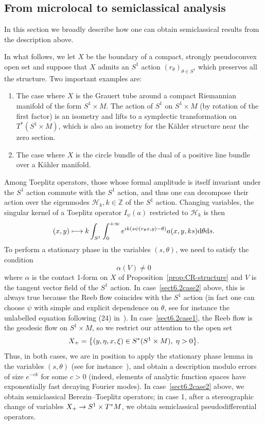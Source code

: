 \documentclass[10pt]{amsart}
\theoremstyle{definition}\newtheorem{defi}[theo]{Definition}\newtheorem{rema}[theo]{Remark}\newtheorem{exam}[theo]{Example}\newtheorem{exem}[theo]{Example}\newtheorem{nota}[theo]{Notation}
\newcommand{\clH}{\mathcal{H}}
\newcommand\1{\mathds{1}}
\newcommand{\Z}{\mathbb{Z}}
\newcommand{\dd}{\mathrm{d}}
\renewcommand*{\to}{\mathchoice{\longrightarrow}{\rightarrow}{\rightarrow}{\rightarrow}}
\let\oldmapsto\mapsto
\renewcommand*{\mapsto}{\mathchoice{\longmapsto}{\oldmapsto}{\oldmapsto}{\oldmapsto}}
\let\originalleft\left
\let\originalright\right
\renewcommand{\left}{\mathopen{}\mathclose\bgroup\originalleft}
\renewcommand{\right}{\aftergroup\egroup\originalright}
\begin{document}
\subsection{From microlocal to semiclassical analysis}\label{sec:from-micr-semicl}
In this section we broadly describe how one can obtain semiclassical results from the description above.

In what follows, we let $X$ be the boundary of a compact, strongly pseudoconvex open set and suppose that $X$ admits an $S^1$ action $(r_{\theta})_{\theta\in S^1}$ which preserves all the structure. Two important examples are:
\begin{enumerate}
\item\label{sect6.2case1} The case where $X$ is the Grauert tube around a compact Riemannian manifold of the form $S^1\times M$. The action of $S^1$ on $S^1\times M$ (by rotation of the first factor) is an isometry and lifts to a symplectic transformation on $T^*(S^1\times M)$, which is also an isometry for the K\"ahler structure near the zero section.
\item\label{sect6.2case2} The case where $X$ is the circle bundle of the dual of a positive line bundle over a K\"ahler manifold.
\end{enumerate}

Among Toeplitz operators, those whose formal amplitude is itself invariant under the $S^1$ action commute with the $S^1$ action, and thus one can decompose their action over the eigenmodes $\clH_k,k\in \Z$ of the $S^1$ action. Changing variables, the singular kernel of a Toeplitz operator $I_{\psi}(a)$ restricted to $\clH_k$ is then
\[
(x,y)\mapsto k\int_{S^1}\int_{0}^{+\infty}e^{ik(s\psi(r_{\theta}x,y)-\theta)}a(x,y,ks)\dd
\theta \dd s.
\]
To perform a stationary phase in the variables $(s,\theta)$, we need to satisfy the condition
\[
\alpha(V)\neq 0
\]
where $\alpha$ is the contact 1-form on $X$ of Proposition~\ref{prop:CR-structure} and $V$ is the tangent vector field of the $S^1$ action. In case~\eqref{sect6.2case2} above, this is always true because the Reeb flow coincides with the $S^1$ action (in fact one can choose $\psi$ with simple and explicit dependence on $\theta$, see for instance the unlabelled equation following (24) in~\cite{zelditch_pointwise_2018}). In case~\eqref{sect6.2case1}, the Reeb flow is the geodesic flow on $S^1\times M$, so we restrict our attention to the open set
\[
X_+=\left\{(y,\eta,x,\xi)\in S^*(S^1\times M),\; \eta>0\right\}.
\]
Thus, in both cases, we are in position to apply the stationary phase lemma in the variables $(s,\theta)$ (see for instance~\cite{zelditch_szego_2000}), and obtain a description modulo errors of size $e^{-ck}$ for some $c>0$ (indeed, elements of analytic function spaces have exponentially fast decaying Fourier modes). In case~\eqref{sect6.2case2} above, we obtain semiclassical Berezin--Toeplitz operators; in case 1, after a stereographic change of variables $X_+\to S^1\times T^*M$, we obtain semiclassical pseudodifferential operators.
\end{document}
